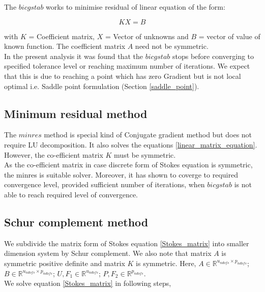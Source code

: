 \documentclass[a4paper,12pt]{book}
\begin{document}
The $bicgstab$ works to minimise residual of linear equation of the form:

\begin{equation} \label{linear_matrix_equation}
KX = B
\end{equation}

with $K$ = Coefficient matrix, $X$ = Vector of unknowns and $B$ = vector of value of known function. The coefficient matrix $A$ need not be symmetric. \\

In the present analysis it was found that the $bicgstab$ stops before converging to specified tolerance level or reaching maximum number of iterations. We expect that this is due to reaching a point which has zero Gradient but is not local optimal i.e. Saddle point formulation (Section \ref{saddle_point}). 

\subsection{Minimum residual method} 

The $minres$ method is special kind of Conjugate gradient method but does not require LU decomposition. It also solves the equations \ref{linear_matrix_equation}. However, the co-efficient matrix $K$ must be symmetric. \\

As the co-efficient matrix in case discrete form of Stokes equation is symmetric, the minres is suitable solver. Moreover, it has shown to coverge to required convergence level, provided sufficient number of iterations, when $bicgstab$ is not able to reach required level of convergence.

\subsection{Schur complement method} \cite{Fritzen} \label{schur}

We subdivide the matrix form of Stokes equation \eqref{Stokes_matrix} into smaller dimension system by Schur complement. We also note that matrix $A$ is symmetric positive definite and matrix $K$ is symmetric.
Here, $A \in \mathbb{R}^{u_{ndofs} \times p_{ndofs}}$; $B \in \mathbb{R}^{u_{ndofs} \times p_{ndofs}}$; $U,F_1 \in \mathbb{R}^{u_{ndofs}}$; $P, F_2 \in \mathbb{R}^{p_{ndofs}}$. \\

We solve equation \eqref{Stokes_matrix} in following steps,\\
\end{document}
